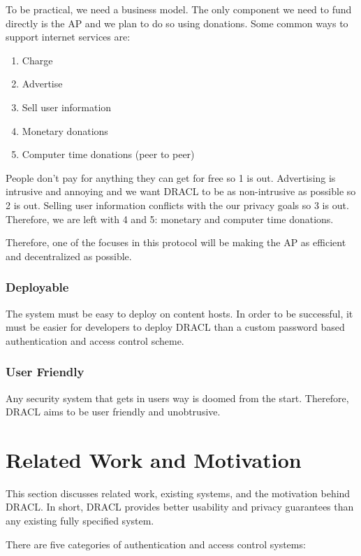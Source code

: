 \documentclass[pdftex,12pt,a4papaer]{article}
\begin{document}
To be practical, we need a business model. The only component we need to fund
directly is the AP and we plan to do so using donations. Some common ways to
support internet services are:

\begin{enumerate}
    \item Charge
    \item Advertise
    \item Sell user information
    \item Monetary donations
    \item Computer time donations (peer to peer)
\end{enumerate}

People don't pay for anything they can get for free so 1 is out. Advertising is
intrusive and annoying and we want DRACL to be as non-intrusive as possible so 2
is out. Selling user information conflicts with the our privacy goals so 3 is
out. Therefore, we are left with 4 and 5: monetary and computer time donations.

Therefore, one of the focuses in this protocol will be making the AP as
efficient and decentralized as possible.

\subsubsection{Deployable}

The system must be easy to deploy on content hosts. In order to be successful,
it must be easier for developers to deploy DRACL than a custom password based
authentication and access control scheme.

\subsubsection{User Friendly}

Any security system that gets in users way is doomed from the start. Therefore,
DRACL aims to be user friendly and unobtrusive.

\section{Related Work and Motivation}

This section discusses related work, existing systems, and the motivation behind
DRACL\@. In short, DRACL provides better usability and privacy guarantees than
any existing fully specified system.

There are five categories of authentication and access control systems:
\end{document}
